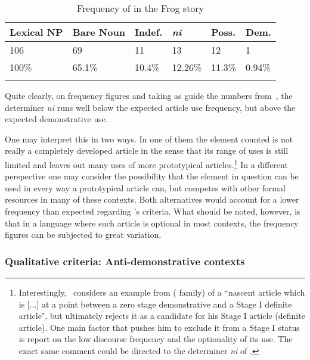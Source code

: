 \documentclass[output=paper
,modfonts
,nonflat]{langsci/langscibook}
\begin{document}
\begin{table}[h]
	\centering
	\caption{Frequency of  in the Frog story}
	\label{tab:pico:4}
	\begin{tabularx}{.75\textwidth}{llXXXX}
		\lsptoprule
		Lexical NP & Bare Noun & Indef. & \cellcolor[HTML]{EFEFEF}\textit{ni} & Poss.  & Dem.  \\ \midrule
		106        & 69        & 11     & 13                                  & 12     & 1     \\ 
		100\%      & 65.1\%      & 10.4\%  & \cellcolor[HTML]{EFEFEF}12.26\%      & 11.3\% & 0.94\% \\ \lspbottomrule
	\end{tabularx}
\end{table}

Quite clearly, on frequency figures and taking as guide the numbers from~\citet{Cyr1993}, the determiner \textit{ni} runs well below the expected article use frequency, but above the expected demonstrative use.

One may interpret this in two ways. In one of them the element counted is not really a completely developed article in the sense that its range of uses is still limited and leaves out many uses of more prototypical articles.\footnote{Interestingly,~\citet[62]{Greenberg1978howgender} considers an example from  ( family) of a ``nascent article which is [...] at a point between a zero stage demonstrative and a Stage I definite article", but ultimately rejects it as a candidate for his Stage I article (definite article). One main factor that pushes him to exclude it from a Stage I status is  report on the low discourse frequency and the optionality of its use. The exact same comment could be directed to the determiner \textit{ni} of .} In a different perspective one may consider the possibility that the element in question can be used in every way a prototypical article can, but competes with other formal resources in many of these contexts. Both alternatives would account for a lower frequency than expected regarding \citet{Cyr1993}'s criteria. What should be noted, however, is that in a language where such article is optional in most contexts, the frequency figures can be subjected to great variation.

\subsubsection{Qualitative criteria: Anti-demonstrative contexts}\label{sec:pico:4.1.2}
\end{document}
